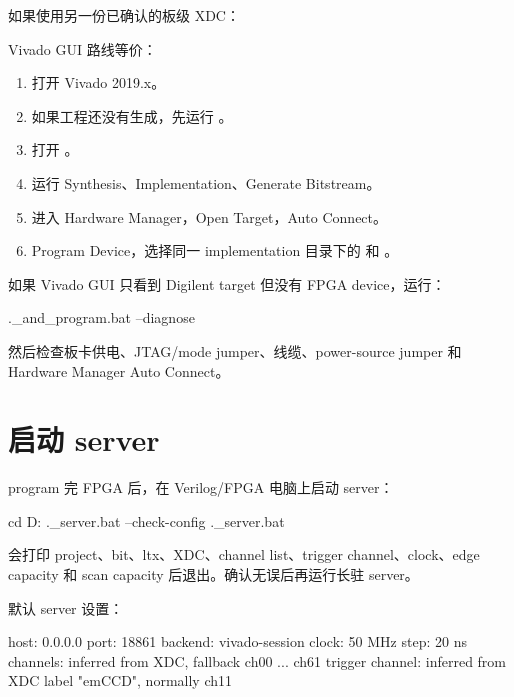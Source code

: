 \documentclass[11pt,oneside,openany]{book}
\begin{document}
如果使用另一份已确认的板级 XDC：


Vivado GUI 路线等价：

\begin{enumerate}
  \item 打开 Vivado 2019.x。
  \item 如果工程还没有生成，先运行 。
  \item 打开 。
  \item 运行 Synthesis、Implementation、Generate Bitstream。
  \item 进入 Hardware Manager，Open Target，Auto Connect。
  \item Program Device，选择同一 implementation 目录下的  和 。
\end{enumerate}

如果 Vivado GUI 只看到 Digilent target 但没有 FPGA device，运行：

\begin{codeblock}[PowerShell]
.\fpga\build_and_program.bat --diagnose
\end{codeblock}

然后检查板卡供电、JTAG/mode jumper、线缆、power-source jumper 和 Hardware Manager Auto Connect。

\section{启动 server}
program 完 FPGA 后，在 Verilog/FPGA 电脑上启动 server：

\begin{codeblock}[PowerShell]
cd D:\ZLC
.\fpga\run_server.bat --check-config
.\fpga\run_server.bat
\end{codeblock}

 会打印 project、bit、ltx、XDC、channel list、trigger channel、clock、edge capacity 和 scan capacity 后退出。确认无误后再运行长驻 server。

默认 server 设置：

\begin{codeblock}
host:            0.0.0.0
port:            18861
backend:         vivado-session
clock:           50 MHz
step:            20 ns
channels:        inferred from XDC, fallback ch00 ... ch61
trigger channel: inferred from XDC label "emCCD", normally ch11
\end{codeblock}
\end{document}
